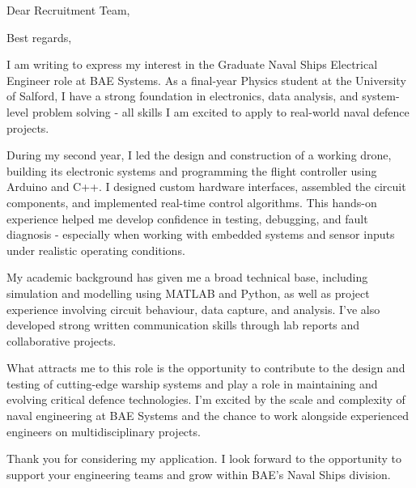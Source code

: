 \documentclass[11pt,a4paper,sans]{moderncv}
\begin{document}
\date{4 June 2025}
\opening{Dear Recruitment Team,}
\closing{Best regards,}
\makelettertitle

I am writing to express my interest in the Graduate Naval Ships Electrical Engineer role at BAE Systems. As a final-year Physics student at the University of Salford, I have a strong foundation in electronics, data analysis, and system-level problem solving - all skills I am excited to apply to real-world naval defence projects.

During my second year, I led the design and construction of a working drone, building its electronic systems and programming the flight controller using Arduino and C++. I designed custom hardware interfaces, assembled the circuit components, and implemented real-time control algorithms. This hands-on experience helped me develop confidence in testing, debugging, and fault diagnosis - especially when working with embedded systems and sensor inputs under realistic operating conditions.

My academic background has given me a broad technical base, including simulation and modelling using MATLAB and Python, as well as project experience involving circuit behaviour, data capture, and analysis. I’ve also developed strong written communication skills through lab reports and collaborative projects.

What attracts me to this role is the opportunity to contribute to the design and testing of cutting-edge warship systems and play a role in maintaining and evolving critical defence technologies. I’m excited by the scale and complexity of naval engineering at BAE Systems and the chance to work alongside experienced engineers on multidisciplinary projects.

Thank you for considering my application. I look forward to the opportunity to support your engineering teams and grow within BAE’s Naval Ships division.

\makeletterclosing
\end{document}
